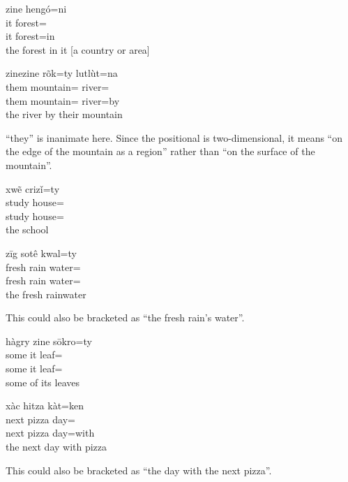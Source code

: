 \documentclass[12pt]{article}
\begin{document}
    \begin{exe}
        \ex
        \glll
        zine hengó=ni \\
        it forest=\InessTwo{} \\
        it forest=in \\
        \glt
        the forest in it [a country or area]
    \end{exe}

    \begin{exe}
        \ex
        \glll
        zinezine rõk=ty lutlùt=na \\
        them mountain=\poss{} river=\adesstwo{} \\
        them mountain=\poss{} river=by \\
        \glt
        the river by their mountain
    \end{exe}
    ``they'' is inanimate here.
    Since the positional is two-dimensional,
    it means ``on the edge of the mountain as a region''
    rather than ``on the surface of the mountain''.

    \begin{exe}
        \ex
        \glll
        xwẽ crizǐ=ty \\
        study house=\Poss{} \\
        study house=\Poss{} \\
        \glt
        the school
    \end{exe}

    \begin{exe}
        \ex
        \glll
        zīg sotê kwal=ty \\
        fresh rain water=\Poss{} \\
        fresh rain water=\Poss{} \\
        \glt
        the fresh rainwater
    \end{exe}
    This could also be bracketed as ``the fresh rain's water''.

    \begin{exe}
        \ex
        \glll
        hàgry zine sōkro=ty \\
        some it leaf=\Poss{} \\
        some it leaf=\Poss{} \\
        \glt
        some of its leaves
    \end{exe}

    \begin{exe}
        \ex
        \glll
        xàc hitza kàt=ken \\
        next pizza day=\Com{} \\
        next pizza day=with \\
        \glt
        the next day with pizza
    \end{exe}
    This could also be bracketed as ``the day with the next pizza''.
\end{document}
